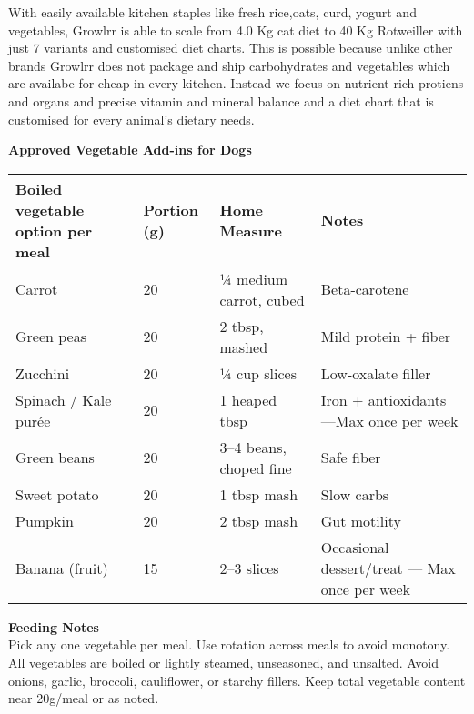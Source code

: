 \vspace{1mm}

With easily available kitchen staples like fresh rice,oats, curd, yogurt and vegetables, Growlrr is able to scale from 4.0 Kg cat diet to 40 Kg Rotweiller with just 7 variants and customised diet charts. This is possible because unlike other brands Growlrr does not package and ship carbohydrates and vegetables which are availabe for cheap in every kitchen. Instead we focus on nutrient rich protiens and organs and precise vitamin and mineral balance and a diet chart that is customised for every animal's dietary needs. 
\newpage

\begin{flushleft}
\textbf{Approved Vegetable Add-ins for Dogs}\\[4pt]
\end{flushleft}

\vspace{3mm}

\begin{tabularx}{\linewidth}{@{} l l l X @{}}
\toprule
\textbf{Boiled vegetable option per meal} & \textbf{Portion (g)} & \textbf{Home Measure} & \textbf{Notes}\\
\midrule
Carrot & 20 & ¼ medium carrot, cubed & Beta-carotene\\[3pt]
Green peas & 20 & 2 tbsp, mashed & Mild protein + fiber\\[3pt]
Zucchini & 20 & ¼ cup slices & Low-oxalate filler\\[3pt]
Spinach / Kale purée & 20 & 1 heaped tbsp & Iron + antioxidants ---Max once per week\\[3pt]
Green beans & 20 & 3–4 beans, choped fine & Safe fiber\\[3pt]
Sweet potato & 20 & 1 tbsp mash & Slow carbs\\[3pt]
Pumpkin & 20 & 2 tbsp mash & Gut motility\\[3pt]
Banana (fruit) & 15 & 2–3 slices & Occasional dessert/treat --- Max once per week\\[3pt]
\bottomrule
\end{tabularx}

\vspace{2mm}

\begin{flushleft}
\textbf{Feeding Notes}\\[2pt]
Pick any one vegetable per meal. Use rotation across meals to avoid monotony. 
All vegetables are boiled or lightly steamed, unseasoned, and unsalted.
Avoid onions, garlic, broccoli, cauliflower, or starchy fillers. 
Keep total vegetable content near 20g/meal or as noted. 
\end{flushleft}

